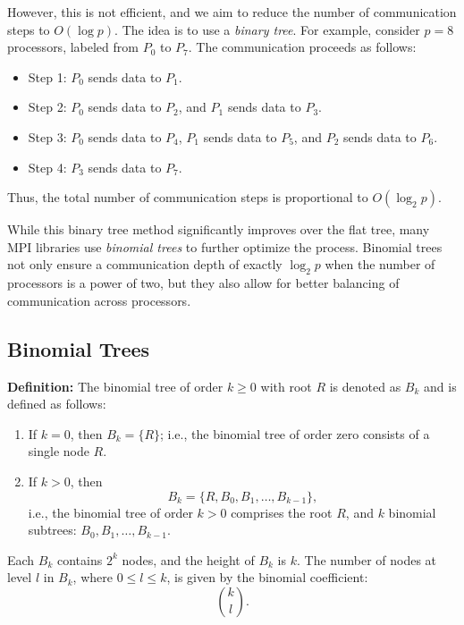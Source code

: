 \documentclass[12pt]{book}
\begin{document}
However, this is not efficient, and we aim to reduce the number of communication steps to $O(\log p)$. The idea is to use a \textit{binary tree}. For example, consider $p=8$ processors, labeled from $P_0$ to $P_7$. The communication proceeds as follows:
\begin{itemize}
    \item Step 1: $P_0$ sends data to $P_1$.
    \item Step 2: $P_0$ sends data to $P_2$, and $P_1$ sends data to $P_3$.
    \item Step 3: $P_0$ sends data to $P_4$, $P_1$ sends data to $P_5$, and $P_2$ sends data to $P_6$.
    \item Step 4: $P_3$ sends data to $P_7$.
\end{itemize}
Thus, the total number of communication steps is proportional to $O(\log_2 p)$. 

While this binary tree method significantly improves over the flat tree, many MPI libraries use \textit{binomial trees} to further optimize the process. Binomial trees not only ensure a communication depth of exactly $\log_2 p$ when the number of processors is a power of two, but they also allow for better balancing of communication across processors.

\subsection{Binomial Trees}
\textbf{Definition:} The binomial tree of order $k \geq 0$ with root $R$ is denoted as $B_k$ and is defined as follows:
\begin{enumerate}
    \item If $k=0$, then $B_k = \{R\}$; i.e., the binomial tree of order zero consists of a single node $R$.
    \item If $k>0$, then 
    \[
    B_k = \{R, B_0, B_1, \ldots, B_{k-1}\},
    \]
    i.e., the binomial tree of order $k>0$ comprises the root $R$, and $k$ binomial subtrees: $B_0, B_1, \ldots, B_{k-1}$.
\end{enumerate}

Each $B_k$ contains $2^k$ nodes, and the height of $B_k$ is $k$. The number of nodes at level $l$ in $B_k$, where $0 \leq l \leq k$, is given by the binomial coefficient:
\[
\binom{k}{l}.
\]
\end{document}
